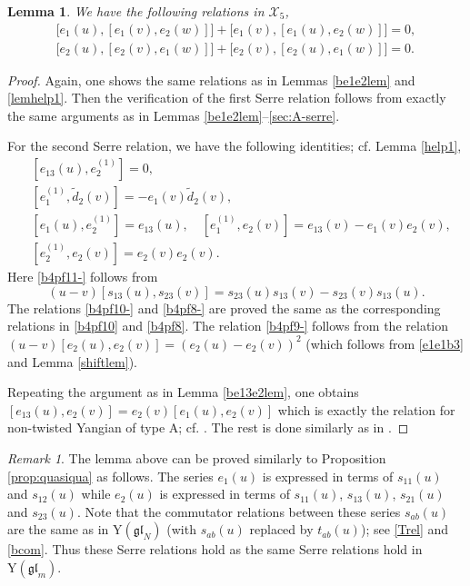 \documentclass[11pt,reqno]{amsart}
\numberwithin{equation}{section}
\newtheorem{lem}[thm]{Lemma}
\theoremstyle{definition}
\theoremstyle{remark}
\newtheorem{rem}[thm]{Remark}
\newcommand{\gl}{\mathfrak{gl}}
\newcommand{\rY}{\mathrm{Y}}
\newcommand{\tl}{\tilde}
\newcommand{\scrX}{{\mathscr{X}}}
\begin{document}

\begin{lem}\label{mmm}
We have the following relations in $\scrX_5$,
\begin{align*}
\big[e_1(u),[e_1(v),e_2(w)]\big]+\big[e_1(v),[e_1(u),e_2(w)]\big]=0,\\
\big[e_2(u),[e_2(v),e_1(w)]\big]+\big[e_2(v),[e_2(u),e_1(w)]\big]=0.
\end{align*}
\end{lem}
\begin{proof}
Again, one shows the same relations as in Lemmas \ref{be1e2lem} and \ref{lemhelp1}. Then the verification of the first Serre relation follows from exactly the same arguments as in Lemmas \ref{be1e2lem}--\ref{sec:A-serre}.

For the second Serre relation, we have the following identities; cf. Lemma \ref{help1},
\begin{align}
&[e_{13}(u),e_2^{(1)}]=0,\label{b4pf11-}\\
&[e_1^{(1)},\tl d_2(v)]=-e_1(v)\tl d_2(v), \label{b4pf10-}\\
&[e_1(u),e_2^{(1)}]=e_{13}(u),\quad [e_1^{(1)},e_2(v)]=e_{13}(v)-e_1(v)e_2(v),\label{b4pf8-}\\
&[e_2^{(1)},e_2(v)]=e_2(v)e_2(v).\label{b4pf9-}
\end{align}
Here \eqref{b4pf11-} follows from
\[
(u-v)[s_{13}(u),s_{23}(v)]=s_{23}(u)s_{13}(v)-s_{23}(v)s_{13}(u).
\]
The relations \eqref{b4pf10-} and \eqref{b4pf8-} are proved the same as the corresponding relations in \eqref{b4pf10} and \eqref{b4pf8}. The relation \eqref{b4pf9-} follows from the relation $(u-v)[e_2(u),e_2(v)]=(e_2(u)-e_2(v))^2$ (which follows from \eqref{e1e1b3} and Lemma \ref{shiftlem}).

Repeating the argument as in Lemma \ref{be13e2lem}, one obtains $[e_{13}(u),e_2(v)]=e_2(v)[e_1(u),e_2(v)]$ which is exactly the relation for non-twisted Yangian of type A; cf. \cite[Lem. 5.5 (iii)]{BK05}. The rest is done similarly as in \cite[Lem. 5.7 (i)]{BK05}.
\end{proof}
\begin{rem}
The lemma above can be proved similarly to Proposition \ref{prop:quasiqua} as follows. The series $e_1(u)$ is expressed in terms of $s_{11}(u)$ and $s_{12}(u)$ while $e_2(u)$ is expressed in terms of $s_{11}(u)$, $s_{13}(u)$, $s_{21}(u)$ and $s_{23}(u)$. Note that the commutator relations between these series $s_{ab}(u)$ are the same as in $\rY(\gl_N)$ (with $s_{ab}(u)$ replaced by $t_{ab}(u)$); see \eqref{Trel} and \eqref{bcom}. Thus these Serre relations hold as the same Serre relations hold in $\rY(\gl_m)$.
\end{rem}
\end{document}
